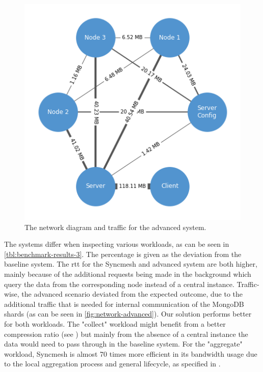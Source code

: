 \documentclass[conference]{IEEEtran}
\begin{document}
\begin{figure}[!h]
	\centering
		\includegraphics[width=0.7\linewidth]{img/network_advanced.png}
	\caption{The network diagram and traffic for the advanced system.}
    \label{fig:network-advanced}
\end{figure}

The systems differ when inspecting various workloads, as can be seen in \autoref{tbl:benchmark-results-3}. The percentage is given as the deviation from the baseline system. The \ac{rtt} for the Syncmesh and advanced system are both higher, mainly because of the additional requests being made in the background which query the data from the corresponding node instead of a central instance.
Traffic-wise, the advanced scenario deviated from the expected outcome, due to the additional traffic that is needed for internal communication of the MongoDB shards (as can be seen in \autoref{fig:network-advanced}). Our solution performs better for both workloads. 
The "collect" workload might benefit from a better compression ratio (see ) but mainly from the absence of a central instance the data would need to pass through in the baseline system. 
For the "aggregate" workload, Syncmesh is almost 70 times more efficient in its bandwidth usage due to the local aggregation process and general lifecycle, as specified in .
\end{document}
